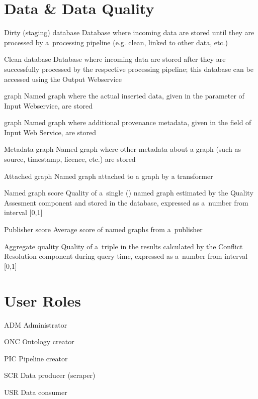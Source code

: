 \section*{Data \& Data Quality}
\begin{glossarylist}
	\item[Dirty (staging) database] Database where incoming data are stored until they are processed by a~processing pipeline (e.g. clean, linked to other data, etc.)
	\item[Clean database] Database where incoming data are stored after they are successfully processed by the respective processing pipeline; this database can be accessed using the Output Webservice
	\item[\code{Payload} graph] Named graph where the actual inserted data, given in the  parameter of Input Webservice, are stored
	\item[\code{Provenance} graph] Named graph where additional provenance metadata, given in the  field of Input Web Service, are stored
	\item[Metadata graph] Named graph where other metadata about a  graph (such as source, timestamp, licence, etc.) are stored
	\item[Attached graph] Named graph attached to a  graph by a transformer
	\item[Named graph score] Quality of a~single () named graph estimated by the Quality Assesment component and stored in the database, expressed as a~number from interval [0,1]
	\item[Publisher score] Average score of named graphs from a~publisher
	\item[Aggregate quality] Quality of a~triple in the results calculated by the Conflict Resolution component during query time, expressed as a~number from interval [0,1]
\end{glossarylist}

\section*{User Roles}
\begin{glossarylist}
	\item[ADM] Administrator
	\item[ONC] Ontology creator
	\item[PIC] Pipeline creator
	\item[SCR] Data producer (scraper)
	\item[USR] Data consumer
\end{glossarylist}

